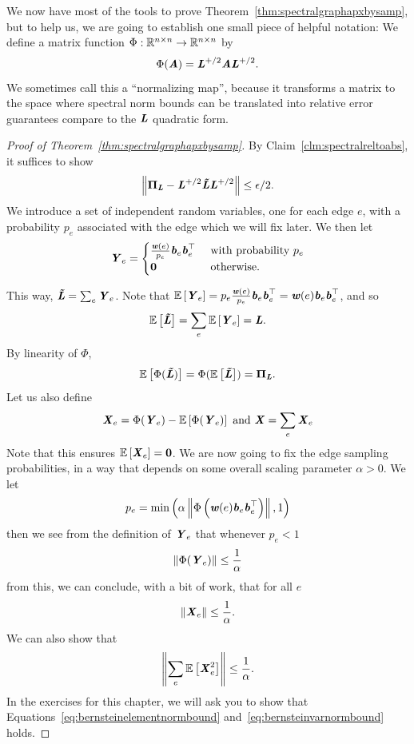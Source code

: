 We now have most of the tools to prove
Theorem~\ref{thm:spectralgraphapxbysamp}, but to help us, we are going
to establish one small piece of helpful notation:
We define a matrix function $\Phi : \mathbb{R}^{n\times n} \to
\mathbb{R}^{n\times n} $
by
\[
  \Phi(\boldsymbol{\mathit{A}}) = \boldsymbol{\mathit{L}}^{+/2}\boldsymbol{\mathit{A}}\boldsymbol{\mathit{L}}^{+/2}.
  \]
We sometimes call this a ``normalizing map'', because it transforms a matrix to
the space where spectral norm bounds can be translated into relative
error guarantees compare to the $\boldsymbol{\mathit{L}}$ quadratic form.
\begin{proof}[Proof of Theorem~\ref{thm:spectralgraphapxbysamp}]
  By Claim~\ref{clm:spectralreltoabs}, it suffices to show
  \begin{equation}
    \label{eq:spectralnormerrbound}
  \left\| \boldsymbol{\Pi}_{\boldsymbol{\mathit{L}}} - \boldsymbol{\mathit{L}}^{+/2}\boldsymbol{\mathit{\tilde{L}}}\boldsymbol{\mathit{L}}^{+/2} \right\| \leq
  \epsilon/2.
\end{equation}
  We introduce a set of independent random variables, one for each
  edge $e$, with a probability $p_e$ associated with the edge which we
  will fix later.
 We then let
  \[
    \boldsymbol{\mathit{Y}}_e =
    \begin{cases}
      \frac{\boldsymbol{\mathit{w}}(e)}{p_e} \boldsymbol{\mathit{b}}_e \boldsymbol{\mathit{b}}_e^{\top}
      & \text{ with probability } p_e
      \\
      \boldsymbol{0}
      & \text{ otherwise. }
    \end{cases}
  \]

This way, $\boldsymbol{\mathit{\tilde{L}}} = \sum_e \boldsymbol{\mathit{Y}}_e$.
Note that $\mathop{{}\mathbb{E}}\left[\boldsymbol{\mathit{Y}}_e\right] = p_e \frac{\boldsymbol{\mathit{w}}(e)}{p_e} \boldsymbol{\mathit{b}}_e \boldsymbol{\mathit{b}}_e^{\top} =
\boldsymbol{\mathit{w}}(e) \boldsymbol{\mathit{b}}_e \boldsymbol{\mathit{b}}_e^{\top}$, and so
\[
  \mathop{{}\mathbb{E}}\left[\boldsymbol{\mathit{\tilde{L}}}\right] =\sum_e \mathop{{}\mathbb{E}}\left[\boldsymbol{\mathit{Y}}_e\right] = \boldsymbol{\mathit{L}}
  .
\]
By linearity of $\Phi$,
\[
\mathop{{}\mathbb{E}}\left[\Phi(\boldsymbol{\mathit{\tilde{L}}})\right] =  \Phi(\mathop{{}\mathbb{E}}\left[\boldsymbol{\mathit{\tilde{L}}}\right]) = \boldsymbol{\Pi}_{\boldsymbol{\mathit{L}}}.
\]
Let us also define
\[
  \boldsymbol{\mathit{X}}_e = \Phi(\boldsymbol{\mathit{Y}}_e) - \mathop{{}\mathbb{E}}\left[\Phi(\boldsymbol{\mathit{Y}}_e)\right] \text{ and } \boldsymbol{\mathit{X}} = \sum_e \boldsymbol{\mathit{X}}_e
\]
Note that this ensures $\mathop{{}\mathbb{E}}\left[\boldsymbol{\mathit{X}}_e\right] = \boldsymbol{0}$.
We are now going to fix the edge sampling probabilities, in a way that
depends on some overall scaling parameter $\alpha > 0$.
We let
\[
  p_e = \min\left( \alpha \left\| \Phi\left(\boldsymbol{\mathit{w}}(e)
      \boldsymbol{\mathit{b}}_e\boldsymbol{\mathit{b}}_e^{\top} \right) \right\|, 1 \right)
\]
then we see from the definition of $\boldsymbol{\mathit{Y}}_e$ that whenever $p_e < 1$
\[
  \left\| \Phi(\boldsymbol{\mathit{Y}}_e)  \right\| \leq \frac{1}{\alpha}
\]
from this, we can conclude, with a bit of work, that for all $e$
\begin{equation}
  \label{eq:bernsteinelementnormbound}
  \left\| \boldsymbol{\mathit{X}}_e \right\| \leq \frac{1}{\alpha}.
\end{equation}
We can also show that
\begin{equation}
  \label{eq:bernsteinvarnormbound}
  \left\| \sum_e \mathop{{}\mathbb{E}}\left[\boldsymbol{\mathit{X}}_e^2\right] \right\| \leq \frac{1}{\alpha}
  .
\end{equation}
In the exercises for this chapter, we will ask you to show that
Equations~\eqref{eq:bernsteinelementnormbound} and~\eqref{eq:bernsteinvarnormbound} holds.


\end{proof}
